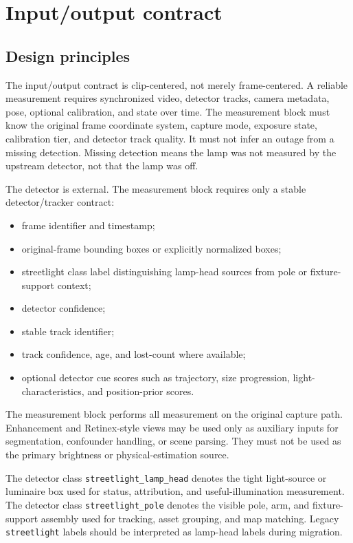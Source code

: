 \documentclass[11pt]{article}
\begin{document}
\section{Input/output contract}

\subsection{Design principles}

The input/output contract is clip-centered, not merely frame-centered. A reliable measurement requires synchronized video, detector tracks, camera metadata, pose, optional calibration, and state over time. The measurement block must know the original frame coordinate system, capture mode, exposure state, calibration tier, and detector track quality. It must not infer an outage from a missing detection. Missing detection means the lamp was not measured by the upstream detector, not that the lamp was off.

The detector is external. The measurement block requires only a stable detector/tracker contract:
\begin{itemize}
  \item frame identifier and timestamp;
  \item original-frame bounding boxes or explicitly normalized boxes;
  \item streetlight class label distinguishing lamp-head sources from pole or fixture-support context;
  \item detector confidence;
  \item stable track identifier;
  \item track confidence, age, and lost-count where available;
  \item optional detector cue scores such as trajectory, size progression, light-characteristics, and position-prior scores.
\end{itemize}

The measurement block performs all measurement on the original capture path. Enhancement and Retinex-style views may be used only as auxiliary inputs for segmentation, confounder handling, or scene parsing. They must not be used as the primary brightness or physical-estimation source.

The detector class \texttt{streetlight\_lamp\_head} denotes the tight light-source or luminaire box used for status, attribution, and useful-illumination measurement. The detector class \texttt{streetlight\_pole} denotes the visible pole, arm, and fixture-support assembly used for tracking, asset grouping, and map matching. Legacy \texttt{streetlight} labels should be interpreted as lamp-head labels during migration.
\end{document}
